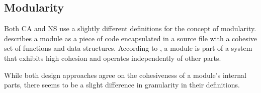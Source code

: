 \subsection{Modularity}

Both CA and NS use a slightly different definitions for the concept of modularity.
\textcite[82]{robert_c_martin_clean_2018} describes a module as a piece of code
encapsulated in a source file with a cohesive set of functions and data structures.
According to \textcite[22]{mannaert_normalized_2016}, a module is part of a system that
exhibits high cohesion and operates independently of other parts. 

While both design approaches agree on the cohesiveness of a module's internal parts, there
seems to be a slight difference in granularity in their definitions.